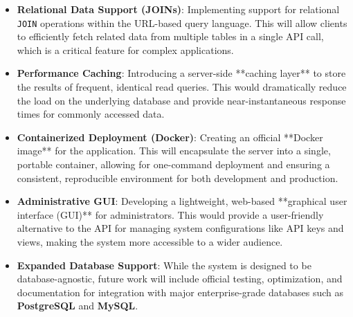 \documentclass[12pt, a4paper]{report}
\begin{document}
\begin{itemize}
    \item \textbf{Relational Data Support (JOINs)}: Implementing support for relational \texttt{JOIN} operations within the URL-based query language. This will allow clients to efficiently fetch related data from multiple tables in a single API call, which is a critical feature for complex applications.

    \item \textbf{Performance Caching}: Introducing a server-side **caching layer** to store the results of frequent, identical read queries. This would dramatically reduce the load on the underlying database and provide near-instantaneous response times for commonly accessed data.

    \item \textbf{Containerized Deployment (Docker)}: Creating an official **Docker image** for the application. This will encapsulate the server into a single, portable container, allowing for one-command deployment and ensuring a consistent, reproducible environment for both development and production.

    \item \textbf{Administrative GUI}: Developing a lightweight, web-based **graphical user interface (GUI)** for administrators. This would provide a user-friendly alternative to the API for managing system configurations like API keys and views, making the system more accessible to a wider audience.

    \item \textbf{Expanded Database Support}: While the system is designed to be database-agnostic, future work will include official testing, optimization, and documentation for integration with major enterprise-grade databases such as \textbf{PostgreSQL} and \textbf{MySQL}.
\end{itemize}
\end{document}
